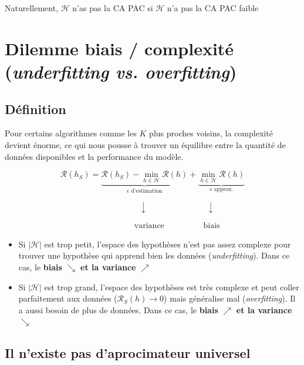 \noindent Naturellement, $\mathcal{H}$ n'as pas la CA PAC si $\mathcal{H}$ n'a pas la CA PAC faible

\section{Dilemme biais / complexité (\textit{underfitting vs. overfitting})}
\subsection{Définition}

\noindent Pour certains algorithmes comme les $K$ plus proches voisins, la complexité devient énorme, ce qui nous pousse à trouver un équilibre entre la 
quantité de données disponibles et la performance du modèle.

\begin{equation}
    \mathcal{R}(h_S) = \underbrace{\mathcal{R}(h_S) - \min_{h \in \mathcal{H}} \mathcal{R}(h)}_{\epsilon \text{ d'estimation}} +  \underbrace{\min_{h \in \mathcal{H}} \mathcal{R}(h)}_{\epsilon \text{ approx.}}
\end{equation}

\[
\phantom{\mathcal{R}(h_S) =}
\quad \downarrow \hspace{3cm} \downarrow
\]

\[
\phantom{\mathcal{R}(h_S) =}
\quad \text{variance} \hspace{2cm} \text{biais}
\]

\begin{itemize}
    \item Si $|\mathcal{H}|$ est trop petit, l'espace des hypothèses n'est pas assez complexe pour trouver une hypothèse qui apprend bien les données (\textit{underfitting}). 
    Dans ce cas, le \textbf{biais} $\searrow$ \textbf{et la variance} $\nearrow$ \newline
    \item Si $|\mathcal{H}|$ est trop grand, l'espace des hypothèses est très complexe et peut coller parfaitement aux données ($\mathcal{R}_S(h) \rightarrow 0$) mais généralise mal (\textit{overfitting}). 
    Il a aussi besoin de plus de données. Dans ce cas, le \textbf{biais} $\nearrow$ \textbf{et la variance} $\searrow$  
\end{itemize}

\subsection{Il n'existe pas d'aprocimateur universel}

